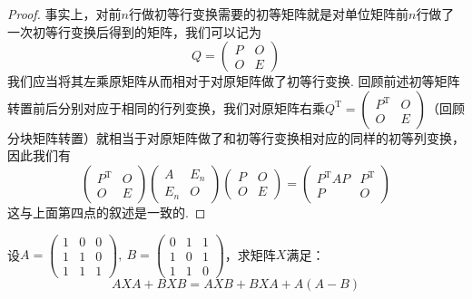 \begin{enumerate}
          \begin{proof}
              事实上，对前$n$行做初等行变换需要的初等矩阵就是对单位矩阵前$n$行做了一次初等行变换后得到的矩阵，我们可以记为
              \[Q=\begin{pmatrix}
                      P & O \\ O & E
                  \end{pmatrix}\]
              我们应当将其左乘原矩阵从而相对于对原矩阵做了初等行变换. 回顾前述初等矩阵转置前后分别对应于相同的行列变换，我们对原矩阵右乘$Q^{\mathrm{T}}=\begin{pmatrix}
                      P^\mathrm{T} & O \\ O & E
                  \end{pmatrix}$（回顾分块矩阵转置）就相当于对原矩阵做了和初等行变换相对应的同样的初等列变换，因此我们有
              \[\begin{pmatrix}
                      P^\mathrm{T} & O \\ O & E
                  \end{pmatrix}\begin{pmatrix}
                      A & E_n \\ E_n & O
                  \end{pmatrix}\begin{pmatrix}
                      P & O \\ O & E
                  \end{pmatrix}=\begin{pmatrix}
                      P^\mathrm{T}AP & P^\mathrm{T} \\ P & O
                  \end{pmatrix}\]
              这与上面第四点的叙述是一致的.
          \end{proof}
\end{enumerate}

\begin{example}
    设$A=\begin{pmatrix}1 & 0 & 0 \\ 1 & 1 & 0 \\ 1 & 1 & 1\end{pmatrix},\ B=\begin{pmatrix}0 & 1 & 1 \\ 1 & 0 & 1 \\ 1 & 1 & 0\end{pmatrix}$，求矩阵$X$满足：
    \[AXA+BXB=AXB+BXA+A(A-B)\]
\end{example}

